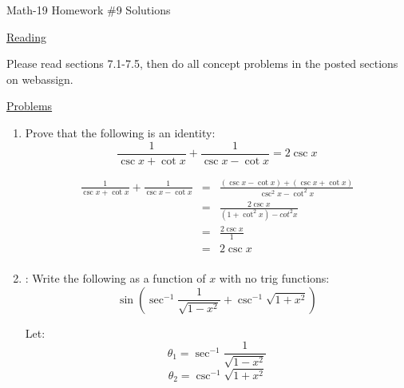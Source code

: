 \documentclass[letterpaper,12pt,fleqn]{article}
\renewcommand{\o}{\theta}
\begin{document}
\begin{center}
\Large Math-19 Homework \#9 Solutions
\end{center}

\vspace{0.5in}

\underline{Reading}

Please read sections 7.1-7.5, then do all concept problems in the posted
sections on web\-assign.

\underline{Problems}

\begin{enumerate}
\item Prove that the following is an identity:
  \[\frac{1}{\csc{x}+\cot{x}}+\frac{1}{\csc{x}-\cot{x}}=2\csc{x}\]

  \begin{eqnarray*}
    \frac{1}{\csc{x}+\cot{x}}+\frac{1}{\csc{x}-\cot{x}} &=&
    \frac{(\csc{x}-\cot{x})+(\csc{x}+\cot{x})}{\csc^2x-\cot^2x} \\
    &=& \frac{2\csc{x}}{(1+\cot^2x)-cot^2x} \\
    &=& \frac{2\csc{x}}{1} \\
    &=& 2\csc{x} \\
  \end{eqnarray*}

\item: Write the following as a function of $x$ with no trig functions:
  \[\sin\left(\sec^{-1}\frac{1}{\sqrt{1-x^2}}+\csc^{-1}\sqrt{1+x^2}\right)\]

  Let:
  \[\o_1=\sec^{-1}\frac{1}{\sqrt{1-x^2}}\]
  \[\o_2=\csc^{-1}\sqrt{1+x^2}\]

  \begin{minipage}{3in}
  \end{minipage}
  \begin{minipage}{3in}
  \end{minipage}


\end{enumerate}
\end{document}
